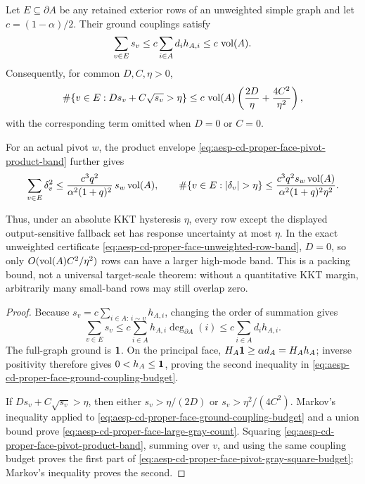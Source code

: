 \begin{corollary}
\label{cor:aesp-cd-proper-face-gray-coupling-packing}
Let \(E\subseteq\partial A\) be any retained exterior rows of an unweighted
simple graph and let \(c=(1-\alpha)/2\).  Their ground couplings satisfy
\begin{equation}
 \sum_{v\in E}s_v
 \leq c\sum_{i\in A}d_ih_{A,i}
 \leq c\,\operatorname{vol}(A).
 \label{eq:aesp-cd-proper-face-ground-coupling-budget}
\end{equation}
Consequently, for common \(D,C,\eta>0\),
\begin{equation}
 \#\{v\in E:D s_v+C\sqrt{s_v}>\eta\}
 \leq
 c\,\operatorname{vol}(A)
 \left(\frac{2D}{\eta}+\frac{4C^2}{\eta^2}\right),
 \label{eq:aesp-cd-proper-face-large-gray-count}
\end{equation}
with the corresponding term omitted when \(D=0\) or \(C=0\).

For an actual pivot \(w\), the product envelope
\cref{eq:aesp-cd-proper-face-pivot-product-band} further gives
\begin{equation}
 \sum_{v\in E}\delta_v^2
 \leq
 \frac{c^3q^2}{\alpha^2(1+q)^2}\,
 s_w\vol(A),
 \qquad
 \#\{v\in E:|\delta_v|>\eta\}
 \leq
 \frac{c^3q^2s_w\vol(A)}
      {\alpha^2(1+q)^2\eta^2}.
 \label{eq:aesp-cd-proper-face-pivot-gray-square-budget}
\end{equation}

Thus, under an absolute KKT hysteresis \(\eta\), every row except the
displayed output-sensitive fallback set has response uncertainty at most
\(\eta\).  In the exact unweighted certificate
\cref{eq:aesp-cd-proper-face-unweighted-row-band}, \(D=0\), so only
\(O(\operatorname{vol}(A)C^2/\eta^2)\) rows can have a larger high-mode band.  This is a
packing bound, not a universal target-scale theorem: without a quantitative
KKT margin, arbitrarily many small-band rows may still overlap zero.
\end{corollary}

\begin{proof}
Because \(s_v=c\sum_{i\in A:\,i\sim v}h_{A,i}\),
changing the order of summation gives
\begin{equation*}
 \sum_{v\in E}s_v
 \leq c\sum_{i\in A}h_{A,i}\deg_{\partial A}(i)
 \leq c\sum_{i\in A}d_ih_{A,i}.
\end{equation*}
The full-graph ground is \(\mathbf{1}\).  On the principal face,
\(H_A\mathbf{1}\geq\alpha d_A=H_Ah_A\); inverse positivity therefore gives
\(0<h_A\leq\mathbf{1}\), proving the second inequality in
\cref{eq:aesp-cd-proper-face-ground-coupling-budget}.

If \(Ds_v+C\sqrt{s_v}>\eta\), then either
\(s_v>\eta/(2D)\) or \(s_v>\eta^2/(4C^2)\).
Markov's inequality applied to
\cref{eq:aesp-cd-proper-face-ground-coupling-budget} and a union bound prove
\cref{eq:aesp-cd-proper-face-large-gray-count}.  Squaring
\cref{eq:aesp-cd-proper-face-pivot-product-band}, summing over \(v\), and
using the same coupling budget proves the first part of
\cref{eq:aesp-cd-proper-face-pivot-gray-square-budget}; Markov's inequality
proves the second.
\end{proof}

